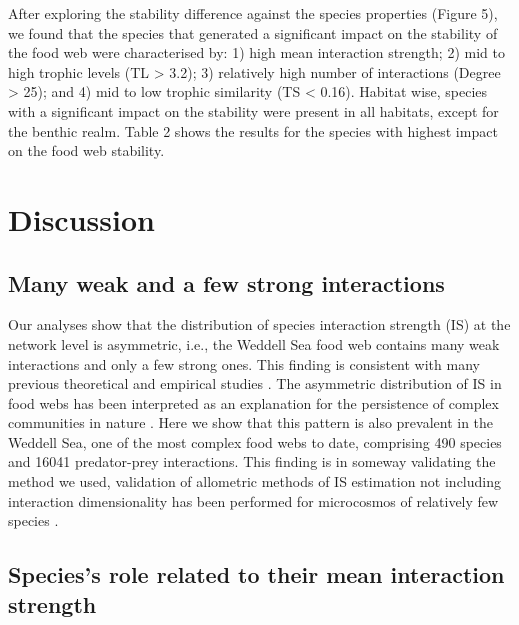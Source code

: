 \documentclass[gc, manuscript]{copernicus}
\begin{document}
After exploring the stability difference against the species properties
(Figure 5), we found that the species that generated a significant
impact on the stability of the food web were characterised by: 1) high
mean interaction strength; 2) mid to high trophic levels (TL
\textgreater{} 3.2); 3) relatively high number of interactions (Degree
\textgreater{} 25); and 4) mid to low trophic similarity (TS \textless{}
0.16). Habitat wise, species with a significant impact on the stability
were present in all habitats, except for the benthic realm. Table 2
shows the results for the species with highest impact on the food web
stability.

\section{Discussion}

\subsection{Many weak and a few strong interactions}

Our analyses show that the distribution of species interaction strength
(IS) at the network level is asymmetric, i.e., the Weddell Sea food web
contains many weak interactions and only a few strong ones. This finding
is consistent with many previous theoretical and empirical studies
\citep[e.g.][]{McCann1998, Neutel2002, Emmerson2004, Wootton2005, Kortsch2021}.
The asymmetric distribution of IS in food webs has been interpreted as
an explanation for the persistence of complex communities in nature
\citep{Bascompte2005, Allesina2015, Nilsson2016}. Here we show that this
pattern is also prevalent in the Weddell Sea, one of the most complex
food webs to date, comprising 490 species and 16041 predator-prey
interactions. This finding is in someway validating the method we used,
validation of allometric methods of IS estimation not including
interaction dimensionality has been performed for microcosmos of
relatively few species \citep{Jonsson2018}.

\subsection{Species's role related to their mean interaction strength}
\end{document}
